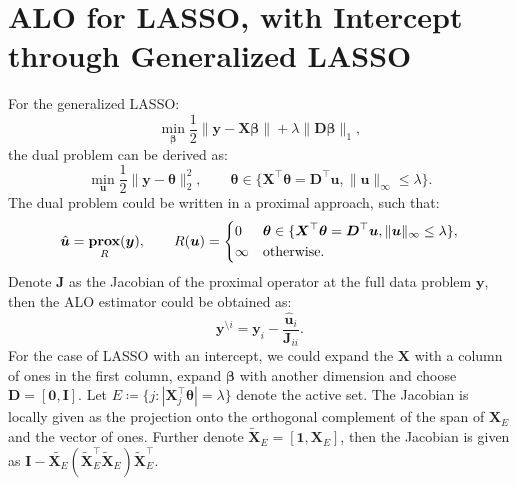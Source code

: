 \documentclass[11pt]{article}
\newcommand{\bu}{\bm{u}}
\newcommand{\by}{\bm{y}}
\newcommand{\bD}{\bm{D}}
\newcommand{\bI}{\bm{I}}
\newcommand{\bJ}{\bm{J}}
\newcommand{\bX}{\bm{X}}
\newcommand{\bbeta}{\bm{\beta}}
\newcommand{\btheta}{\bm{\theta}}
\DeclareMathOperator{\bprox}{\mathbf{prox}}
\begin{document}
\section{ALO for LASSO, with Intercept through Generalized LASSO}
For the generalized LASSO:
	\begin{equation}
	\min\limits_{\bbeta}\frac{1}{2}\|\by-\bX\bbeta\|+\lambda\|\bD\bbeta\|_{1},
	\end{equation}
the dual problem can be derived as:
	\begin{equation}
	\min\limits_{\bu}\frac{1}{2}\|\by-\btheta\|_{2}^{2},\qquad\btheta\in \{\bX^{\top}\btheta = \bD^{\top}\bu, \|\bu\|_{\infty} \leq \lambda\}.
	\end{equation}
The dual problem could be written in a proximal approach, such that: \[\hat{\bu} = \bprox_{R}(\by),\qquad R(\bu) =\begin{dcases}
0 & \btheta \in \{\bX^{\top}\btheta = \bD^{\top}\bu, \|\bu\|_{\infty} \leq \lambda\},\\
\infty & \text{otherwise.}
\end{dcases}\] Denote $\bJ$ as the Jacobian of the proximal operator at the full data problem $\by$, then the ALO estimator could be obtained as: 
	\begin{equation}
	\by^{\setminus i} = \by_{i} - \frac{\hat{\bu}_{i}}{\bJ_{ii}}.
	\end{equation}
For the case of LASSO with an intercept, we could expand the $\bX$ with a column of ones in the first column, expand $\bbeta$ with another dimension and choose $\bD = [\bm{0}, \bI]$. Let \(E\coloneqq\{j:|\bX_{j}^{\top}\btheta| = \lambda \}\) denote the active set. The Jacobian is locally given as the projection onto the orthogonal complement of the span of $\bX_{E}$ and the vector of ones. Further denote $\tilde{\bX}_{E} = [\textbf{1}, \bX_{E}]$, then the Jacobian is given as $\bI - \tilde{\bX_{E}}(\tilde{\bX}_{E}^{\top}\tilde{\bX}_{E})\tilde{\bX}_{E}^{\top}$.
\end{document}
